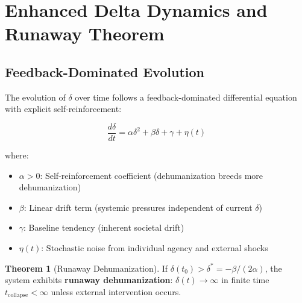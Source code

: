 \documentclass[11pt,a4paper]{article}
\theoremstyle{definition}
\newtheorem{theorem}{Theorem}[section]
\theoremstyle{remark}
\begin{document}

\section{Enhanced Delta Dynamics and Runaway Theorem}
\label{app:enhanced_delta}

\subsection{Feedback-Dominated Evolution}

The evolution of $\delta$ over time follows a feedback-dominated differential equation with explicit self-reinforcement:

\begin{equation}
\frac{d\delta}{dt} = \alpha \delta^2 + \beta \delta + \gamma + \eta(t)
\label{eq:delta_evolution}
\end{equation}

where:
\begin{itemize}[leftmargin=1.5em]
    \item $\alpha > 0$: Self-reinforcement coefficient (dehumanization breeds more dehumanization)
    \item $\beta$: Linear drift term (systemic pressures independent of current $\delta$)
    \item $\gamma$: Baseline tendency (inherent societal drift)
    \item $\eta(t)$: Stochastic noise from individual agency and external shocks
\end{itemize}

\begin{theorem}[Runaway Dehumanization]
\label{thm:runaway}
If $\delta(t_0) > \delta^* = -\beta/(2\alpha)$, the system exhibits \textbf{runaway dehumanization}: $\delta(t) \to \infty$ in finite time $t_{\text{collapse}} < \infty$ unless external intervention occurs.
\end{theorem}
\end{document}
